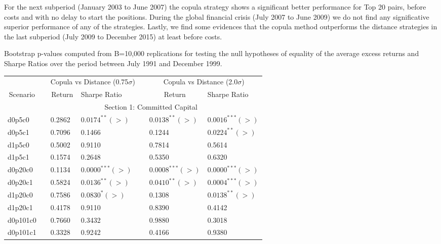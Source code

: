 \documentclass[a4paper]{article}
\begin{document}
	For the next subperiod (January 2003 to June 2007) the copula strategy shows a significant better performance for Top 20 pairs, before costs and with no delay to start the positions. During the global financial crisis (July 2007 to June 2009) we do not find any significative superior performance of any of the strategies. Lastly, we find some evidences that the copula method outperforms the distance strategies in the last subperiod (July 2009 to December 2015) at least before costs.
	
	\medskip
	
	\begin{threeparttable}[H]
		\centering \scriptsize
		\caption{Bootstrap p-values computed from B=10,000 replications for testing the null hypotheses of equality of the average excess returns and Sharpe Ratios over the period between July 1991 and December 1999.}
		\begin{tabularx}{\textwidth}{@{\extracolsep{\fill}}lllllll@{}}
			\toprule
			& & \multicolumn{2}{c}{Copula vs Distance (0.75$\sigma$)} & \multicolumn{1}{c}{} & \multicolumn{2}{c}{Copula vs Distance (2.0$\sigma$)} \\
			\cmidrule{3-4}  \cmidrule{6-7}
			\multicolumn{1}{c}{Scenario} & & \multicolumn{1}{c}{Return} & Sharpe Ratio &       & \multicolumn{1}{c}{Return}& Sharpe Ratio \\
			\midrule
			& \multicolumn{6}{c}{Section 1: Committed Capital} \\
			\midrule
			d0p5c0 & & 0.2862 & $0.0174^{**}(>)$ &       & $0.0138^{**}(>)$ & $0.0016^{***}(>)$ \\
			d0p5c1 & & 0.7096 & 0.1466 &       & 0.1244 & $0.0224^{**}(>)$ \\
			d1p5c0 & & 0.5002 & 0.9110 &       & 0.7814 & 0.5614 \\
			d1p5c1 & & 0.1574 & 0.2648 &       & 0.5350 & 0.6320 \\
			d0p20c0 & & 0.1134 & $0.0000^{***}(>)$ &       & $0.0008^{***}(>)$ & $0.0000^{***}(>)$ \\
			d0p20c1 & & 0.5824 & $0.0136^{**}(>)$ &       & $0.0410^{**}(>)$ & $0.0004^{***}(>)$ \\
			d1p20c0 & & 0.7586 & $0.0830^{*}(>)$ &       & 0.1308 & $0.0138^{**}(>)$ \\
			d1p20c1 & & 0.4178 & 0.9110 &       & 0.8390 & 0.4142 \\
			d0p101c0 & & 0.7660 & 0.3432 &       & 0.9880 & 0.3018 \\
			d0p101c1 & & 0.3328 & 0.9242 &       & 0.4166 & 0.9380 \\

\end{tabularx}
\end{threeparttable}
\end{document}
